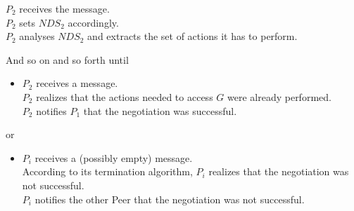 \documentclass{article}
\begin{document}
$P_{2}$ receives the message.\\
$P_{2}$ sets $NDS_{2}$ accordingly.\\
$P_{2}$ analyses $NDS_{2}$ and extracts the set of actions it has to perform.

And so on and so forth until

\begin{itemize}
	\item $P_{2}$ receives a message.\\
	$P_{2}$ realizes that the actions needed to access $G$ were already performed.\\
	$P_{2}$ notifies $P_{1}$ that the negotiation was successful.
\end{itemize}

or

\begin{itemize}
	\item $P_{i}$ receives a (possibly empty) message.\\
	According to its termination algorithm, $P_{i}$ realizes that the negotiation was not successful.\\
	$P_{i}$ notifies the other Peer that the negotiation was not successful.
\end{itemize}
\end{document}
